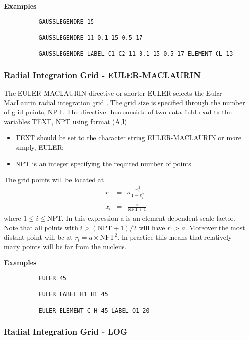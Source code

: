 \documentclass[11pt,fleqn]{article}
\begin{document}
{\bf Examples}

{
\footnotesize
\begin{verbatim}
          GAUSSLEGENDRE 15

          GAUSSLEGENDRE 11 0.1 15 0.5 17

          GAUSSLEGENDRE LABEL C1 C2 11 0.1 15 0.5 17 ELEMENT CL 13
\end{verbatim}
}


\subsubsection{Radial Integration Grid - EULER-MACLAURIN}

The EULER-MACLAURIN directive or shorter EULER selects the
Euler-MacLaurin radial integration grid \cite{murray93}.  The grid size
is specified through the number of grid points, NPT. The directive thus
consists of two data field read to the variables TEXT, NPT using format
(A,I)

\begin{itemize}
\item TEXT should be set to the character string EULER-MACLAURIN or
more simply, EULER;
\item NPT is an integer specifying the required number of points
\end{itemize}

The grid points will be located at
\begin{eqnarray*}
   r_i &=& a \frac{x_i^2}{ 1 - x_i^2} \\
   x_i &=& \frac{i}{\mathrm{NPT} + 1} 
\end{eqnarray*}
where $ 1\leq i \leq \mathrm{NPT}$.
In this expression a is an element dependent scale factor. Note that all points 
with $i > (\mathrm{NPT} + 1)/2$ will have $r_i > a$.  Moreover the most distant
point will be at $r_i = a \times \mathrm{NPT}^2$.  In practice this means that
relatively many points will be far from the nucleus.

{\bf Examples}

{
\footnotesize
\begin{verbatim}
          EULER 45

          EULER LABEL H1 H1 45

          EULER ELEMENT C H 45 LABEL O1 20 
\end{verbatim}
}

\subsubsection{Radial Integration Grid - LOG}
\end{document}
